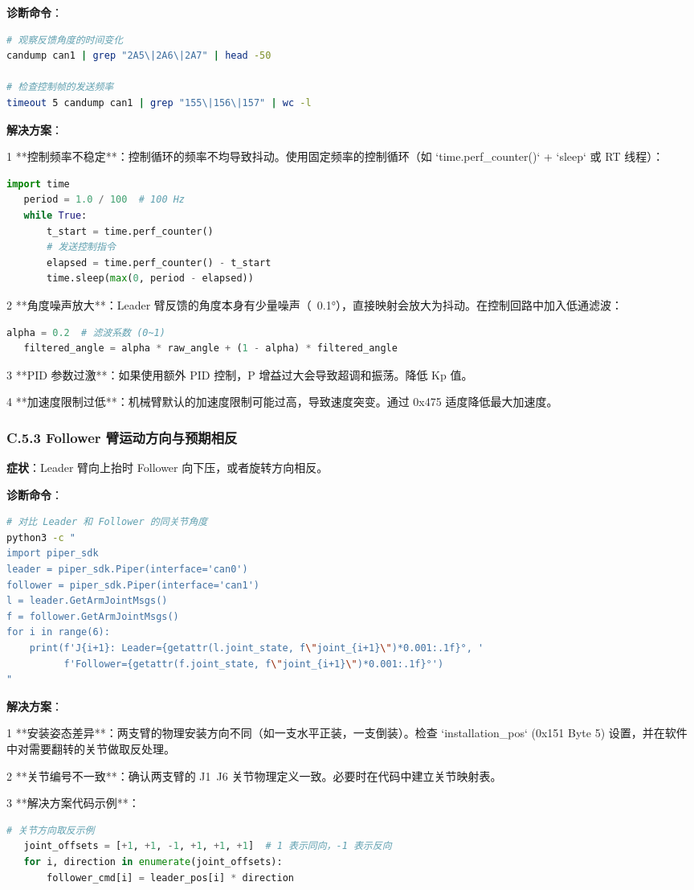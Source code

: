 \documentclass[UTF8,a4paper,11pt]{ctexart}
\begin{document}
{\textbf{诊断命令}：
\begin{lstlisting}[language=bash]
# 观察反馈角度的时间变化
candump can1 | grep "2A5\|2A6\|2A7" | head -50

# 检查控制帧的发送频率
timeout 5 candump can1 | grep "155\|156\|157" | wc -l
\end{lstlisting}

\textbf{解决方案}：
\item[1] **控制频率不稳定**：控制循环的频率不均导致抖动。使用固定频率的控制循环（如 `time.perf_counter()` + `sleep` 或 RT 线程）：
\begin{lstlisting}[language=python]
   import time
   period = 1.0 / 100  # 100 Hz
   while True:
       t_start = time.perf_counter()
       # 发送控制指令
       elapsed = time.perf_counter() - t_start
       time.sleep(max(0, period - elapsed))
\end{lstlisting}
\item[2] **角度噪声放大**：Leader 臂反馈的角度本身有少量噪声（~0.1°），直接映射会放大为抖动。在控制回路中加入低通滤波：
\begin{lstlisting}[language=python]
   alpha = 0.2  # 滤波系数 (0~1)
   filtered_angle = alpha * raw_angle + (1 - alpha) * filtered_angle
\end{lstlisting}
\item[3] **PID 参数过激**：如果使用额外 PID 控制，P 增益过大会导致超调和振荡。降低 Kp 值。
\item[4] **加速度限制过低**：机械臂默认的加速度限制可能过高，导致速度突变。通过 0x475 适度降低最大加速度。

\subsubsection{C.5.3 Follower 臂运动方向与预期相反}

\textbf{症状}：Leader 臂向上抬时 Follower 向下压，或者旋转方向相反。

\textbf{诊断命令}：
\begin{lstlisting}[language=bash]
# 对比 Leader 和 Follower 的同关节角度
python3 -c "
import piper_sdk
leader = piper_sdk.Piper(interface='can0')
follower = piper_sdk.Piper(interface='can1')
l = leader.GetArmJointMsgs()
f = follower.GetArmJointMsgs()
for i in range(6):
    print(f'J{i+1}: Leader={getattr(l.joint_state, f\"joint_{i+1}\")*0.001:.1f}°, '
          f'Follower={getattr(f.joint_state, f\"joint_{i+1}\")*0.001:.1f}°')
"
\end{lstlisting}

\textbf{解决方案}：
\item[1] **安装姿态差异**：两支臂的物理安装方向不同（如一支水平正装，一支倒装）。检查 `installation_pos` (0x151 Byte 5) 设置，并在软件中对需要翻转的关节做取反处理。
\item[2] **关节编号不一致**：确认两支臂的 J1~J6 关节物理定义一致。必要时在代码中建立关节映射表。
\item[3] **解决方案代码示例**：
\begin{lstlisting}[language=python]
   # 关节方向取反示例
   joint_offsets = [+1, +1, -1, +1, +1, +1]  # 1 表示同向，-1 表示反向
   for i, direction in enumerate(joint_offsets):
       follower_cmd[i] = leader_pos[i] * direction
\end{lstlisting}

}
\end{document}
